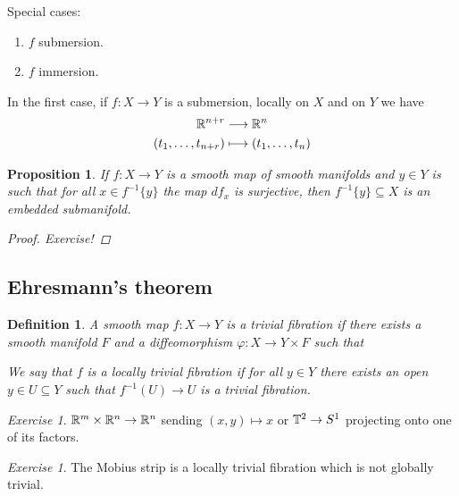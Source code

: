 \documentclass[A4paper, british]{amsart}
\theoremstyle{darkgreentheorem}
\newtheorem{prop}[thm]{Proposition}
\theoremstyle{darkbluedefinition}
\newtheorem{defn}[thm]{Definition}
\theoremstyle{darkredexample}
\theoremstyle{remark}
\newtheorem{exe}[thm]{Exercise}
\newcommand{\1}{\mathbbm{1}}
\newcommand{\tms}{\times}
\newcommand{\sub}{\subseteq}
\begin{document}
Special cases:
\begin{enumerate}
    \item $f$ submersion.
    \item $f$ immersion.
\end{enumerate}

In the first case, if $f\colon X\to Y$ is a submersion, locally on $X$ and on $Y$ we have
\begin{align*}
    \mathbb{R}^{n+r} &\longrightarrow \mathbb{R}^{n} \\
    (t_{1},\ldots,t_{n+r})&\longmapsto (t_{1},\ldots,t_{n})
\end{align*}

\begin{prop}
    If $f\colon X\to Y$ is a smooth map of smooth manifolds and $y\in Y$ is such that for all $x\in f^{-1}\{y\}$ the map $df_{x}$ is surjective, then $f^{-1}\{y\}\sub X$ is an embedded submanifold.
    \begin{proof}
	Exercise!
    \end{proof}
\end{prop}

\subsection{Ehresmann's theorem}

\begin{defn}
    A smooth map $f\colon X\to Y$ is a \textit{trivial fibration} if there exists a smooth manifold $F$ and a diffeomorphism $\varphi\colon X\to Y\tms F$ such that
    \begin{center}
    \end{center}
    We say that $f$ is a \textit{locally trivial fibration} if for all $y\in Y$ there exists an open $y\in U\sub Y$ such that $f^{-1}(U)\to U$ is a trivial fibration.
\end{defn}

\begin{exe}
    $\R^{m}\tms \R^{n}\to \R^{n}$ sending $(x,y)\mapsto x$ or $\mathbb{T}^{2}\to S^{1}$ projecting onto one of its factors.
\end{exe}

\begin{exe}
    The Mobius strip is a locally trivial fibration which is not globally trivial.
\end{exe}
\end{document}
